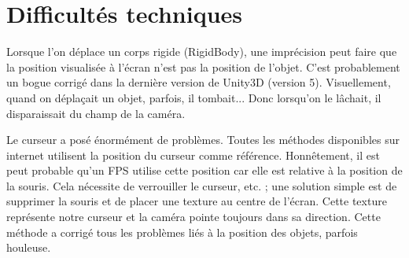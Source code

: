 \documentclass[a4paper,11pt]{myreport}
\begin{document}
\section{Difficultés techniques}
\par Lorsque l'on déplace un corps rigide (RigidBody), une imprécision peut faire que la position visualisée à l'écran n'est pas la position de l'objet. C'est probablement un bogue corrigé dans la dernière version de Unity3D (version 5). Visuellement, quand on déplaçait un objet, parfois, il tombait... Donc lorsqu'on le lâchait, il disparaissait du champ de la caméra.\\
\par Le curseur a posé énormément de problèmes. Toutes les méthodes disponibles sur internet utilisent la position du curseur comme référence. Honnêtement, il est peut probable qu'un FPS utilise cette position car elle est relative à la position de la souris. Cela nécessite de verrouiller le curseur, etc. ; une solution simple est de supprimer la souris et de placer une texture au centre de l'écran. Cette texture représente notre curseur et la caméra pointe toujours dans sa direction. Cette méthode a corrigé tous les problèmes liés à la position des objets, parfois houleuse.
\end{document}
